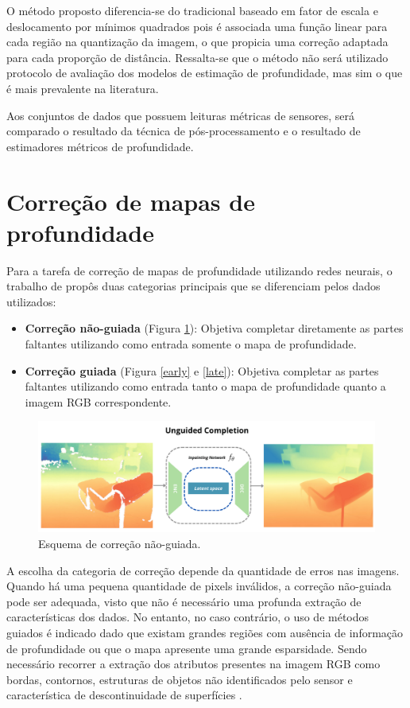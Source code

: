 O método proposto diferencia-se do tradicional baseado em fator de escala e deslocamento por mínimos quadrados pois é associada uma função linear para cada região na quantização da imagem, o que propicia uma correção adaptada para cada proporção de distância. Ressalta-se que o método não será utilizado protocolo de avaliação dos modelos de estimação de profundidade, mas sim o que é mais prevalente na literatura.

Aos conjuntos de dados que possuem leituras métricas de sensores, será comparado o resultado da técnica de pós-processamento e o resultado de estimadores métricos de profundidade.

\section{Correção de mapas de profundidade} 

Para a tarefa de correção de mapas de profundidade utilizando redes neurais, o trabalho de \cite{hu2022deep} propôs duas categorias principais que se diferenciam pelos dados utilizados:

\begin{itemize}
    \item \textbf{Correção não-guiada} (Figura \ref{ung}): Objetiva completar diretamente as partes faltantes utilizando como entrada somente o mapa de profundidade.
    \item \textbf{Correção guiada} (Figura \ref{early} e \ref{late}): Objetiva completar as partes faltantes utilizando como entrada tanto o mapa de profundidade quanto a imagem RGB correspondente.
\end{itemize}

\begin{figure}[h]
    \centering
    \includegraphics[width=\textwidth]{fig/unguided.png}
    \caption{Esquema de correção não-guiada.}
    \label{ung}
\end{figure}

A escolha da categoria de correção depende da quantidade de erros nas imagens. Quando há uma pequena quantidade de pixels inválidos, a correção não-guiada pode ser adequada, visto que não é necessário uma profunda extração de características dos dados. No entanto, no caso contrário, o uso de métodos guiados é indicado dado que existam grandes regiões com ausência de informação de profundidade ou que o mapa apresente uma grande esparsidade. Sendo necessário recorrer a extração dos atributos presentes na imagem RGB como bordas, contornos, estruturas de objetos não identificados pelo sensor e característica de descontinuidade de superfícies \cite{hu2022deep}.

